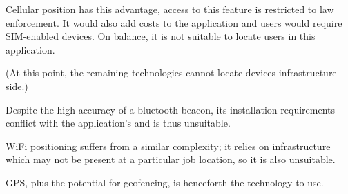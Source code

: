 Cellular position has this advantage, access to this
feature is restricted to law enforcement.
It would also add costs to the application and \projectname
users would require SIM-enabled devices.
On balance, it is not suitable to locate users in this
application.

(At this point, the remaining technologies cannot locate
devices infrastructure-side.)

Despite the high accuracy of a bluetooth beacon, its
installation requirements conflict with the application's
 and is thus
unsuitable.

WiFi positioning suffers from a similar complexity; it
relies on infrastructure which may not be present at a
particular job location, so it is also unsuitable.

GPS, plus the potential for geofencing, is henceforth the
technology to use.
